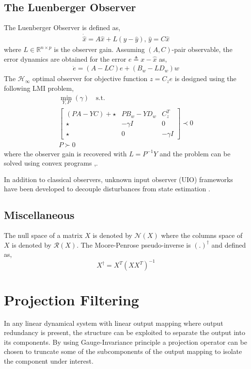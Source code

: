 \subsection{The Luenberger Observer}
The Luenberger Observer is defined as,    
\begin{gather} 
    \dot{\hat{x}}=A \hat{x}+L(y-\hat{y}),\,\hat{y}=C \hat{x}
\end{gather}
where $L\in\mathbb{R}^{n\times p}$ is the observer gain. Assuming $(A,C)$-pair observable, the error dynamics are obtained for the error $e\triangleq x-\hat{x}$ as,
\begin{gather} 
    \dot{e}=(A-LC)e+(B_w-L D_w)w
\end{gather}
The $\mathcal{H}_\infty$ optimal observer for objective function $z=C_ze$ is designed using the following LMI problem\cite{duan2013lmis},
\begin{equation} \label{eqn:lmi1}
\begin{split} 
    \min_{Y,P}{(\gamma)}\quad \mathrm{s.t.}\\
    \begin{bmatrix}
        (PA-YC)+\star& PB_w-YD_w& C_z^T\\
        \star& -\gamma I& 0\\
        \star& 0& -\gamma I
    \end{bmatrix}\prec 0\\
    P\succ 0
\end{split} 
\end{equation}
where the observer gain is recovered with $L=P^{-1}Y$ and the problem can be solved using convex programs \cite{cvx},\cite{gb08}. 

In addition to classical observers, unknown input observer (UIO) frameworks have been developed to decouple disturbances from state estimation \cite{ChenPatton1999}.

\subsection{Miscellaneous}
The null space of a matrix $X$ is denoted by $\mathcal{N}(X)$ where the columns space of $X$ is denoted by $\mathcal{R}(X)$. 
The Moore-Penrose pseudo-inverse is $(.)^\dagger$ and defined as,
\begin{equation}
    X^\dagger=X^T(XX^T)^{-1}
\end{equation}
\section{Projection Filtering}
In any linear dynamical system with linear output mapping where output redundancy is present, the structure can be exploited to separate the output into its components. By using Gauge-Invariance principle a projection operator can be chosen to truncate some of the subcomponents of the output mapping to isolate the component under interest. 

